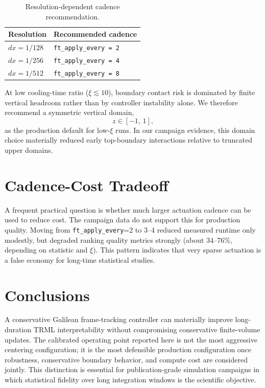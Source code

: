 \documentclass[10pt,twocolumn]{article}
\begin{document}
\begin{table}[t]
\centering
\small
\caption{Resolution-dependent cadence recommendation.}
\label{tab:res}
\begin{tabular}{@{}ll@{}}
\toprule
Resolution & Recommended cadence \\
\midrule
$dx = 1/128$ & \texttt{ft\_apply\_every = 2} \\
$dx = 1/256$ & \texttt{ft\_apply\_every = 4} \\
$dx = 1/512$ & \texttt{ft\_apply\_every = 8} \\
\bottomrule
\end{tabular}
\end{table}

At low cooling-time ratio ($\xi \lesssim 10$), boundary contact risk is dominated by finite vertical headroom rather than by controller instability alone. We therefore recommend a symmetric vertical domain,
\begin{equation}
z \in [-1,\,1],
\end{equation}
as the production default for low-$\xi$ runs. In our campaign evidence, this domain choice materially reduced early top-boundary interactions relative to truncated upper domains.

\section{Cadence-Cost Tradeoff}
A frequent practical question is whether much larger actuation cadence can be used to reduce cost. The campaign data do not support this for production quality. Moving from \texttt{ft\_apply\_every}=2 to 3--4 reduced measured runtime only modestly, but degraded ranking quality metrics strongly (about 34--76\%, depending on statistic and $\xi$). This pattern indicates that very sparse actuation is a false economy for long-time statistical studies.

\section{Conclusions}
A conservative Galilean frame-tracking controller can materially improve long-duration TRML interpretability without compromising conservative finite-volume updates. The calibrated operating point reported here is not the most aggressive centering configuration; it is the most defensible production configuration once robustness, conservative boundary behavior, and compute cost are considered jointly. This distinction is essential for publication-grade simulation campaigns in which statistical fidelity over long integration windows is the scientific objective.
\end{document}
